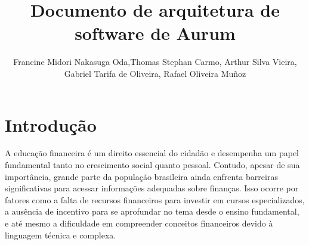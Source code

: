 \documentclass[
	article,			%
	12pt,				%
	oneside,			%
	a4paper,			%
	english,			%
	brazil,				%
	sumario=tradicional
	]{abntex2}
\title{Documento de arquitetura de software de Aurum}
\author{Francine Midori Nakasuga Oda\inst{1},Thomas Stephan Carmo\inst{1}, Arthur Silva Vieira\inst{1},\\ Gabriel Tarifa de Oliveira\inst{1}, Rafael Oliveira Muñoz\inst{1} }
\begin{document}


\frenchspacing 


%
%

\maketitle







\textual

\section{Introdução}
    
    
A educação financeira é um direito essencial do cidadão e desempenha um papel fundamental tanto no crescimento social quanto pessoal. Contudo, apesar de sua importância, grande parte da população brasileira ainda enfrenta barreiras significativas para acessar informações adequadas sobre finanças. Isso ocorre por fatores como a falta de recursos financeiros para investir em cursos especializados, a ausência de incentivo para se aprofundar no tema desde o ensino fundamental, e até mesmo a dificuldade em compreender conceitos financeiros devido à linguagem técnica e complexa.
\end{document}
